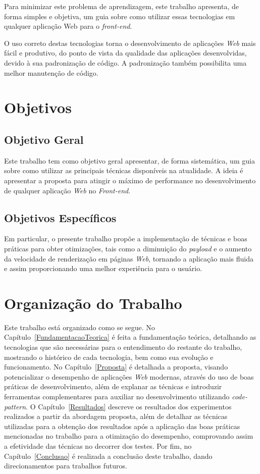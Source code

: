 Para minimizar este problema de aprendizagem, este trabalho apresenta, de forma simples e objetiva, um guia sobre como utilizar essas tecnologias em qualquer aplicação Web para o \textit{front-end}.

O uso correto destas tecnologias torna o desenvolvimento de aplicações \textit{Web} mais fácil e produtivo, do ponto de vista da qualidade das aplicações desenvolvidas, devido à sua padronização de código. A padronização também possibilita uma melhor manutenção de código.
%
%
%
%
%
%
%
%
%
\section{Objetivos}
\label{Objetivos}

\subsection{Objetivo Geral}
\label{ObjetivoGeral}

Este trabalho tem como objetivo geral apresentar, de forma sistemática, um guia sobre como utilizar as principais técnicas disponíveis na atualidade. A ideia é apresentar a proposta para atingir o máximo de performance no desenvolvimento de qualquer aplicação \textit{Web} no \textit{Front-end}.
%
%
%
\subsection{Objetivos Específicos}
\label{ObjetivosEspecificos}

Em particular, o presente trabalho propõe a implementação de técnicas e boas práticas para obter otimizações, tais como a diminuição do \textit{payload} e o aumento da velocidade de renderização em páginas \textit{Web}, tornando a aplicação mais fluida e assim proporcionando uma melhor experiência para o usuário.
%
%
%
%
%
%
%
%
%
\section{Organização do Trabalho}
\label{Organizacao}

Este trabalho está organizado como se segue. No Capítulo~\ref{FundamentacaoTeorica} é feita a fundamentação teórica, detalhando as tecnologias que são necessárias para o entendimento do restante do trabalho, mostrando o histórico de cada tecnologia, bem como sua evolução e funcionamento. No Capítulo~\ref{Proposta} é detalhada a proposta, visando potencializar o desempenho de aplicações \textit{Web} modernas, através do uso de boas práticas de desenvolvimento, além de explanar as técnicas e introduzir ferramentas complementares para auxiliar no desenvolvimento utilizando \textit{code-pattern}. O Capítulo~\ref{Resultados} descreve os resultados dos experimentos realizados a partir da abordagem proposta, além de detalhar as técnicas utilizadas para a obtenção dos resultados após a aplicação das boas práticas mencionadas no trabalho para a otimização do desempenho, comprovando assim a efetividade das técnicas no decorrer dos testes. Por fim, no Capítulo~\ref{Conclusao} é realizada a conclusão deste trabalho, dando direcionamentos para trabalhos futuros.